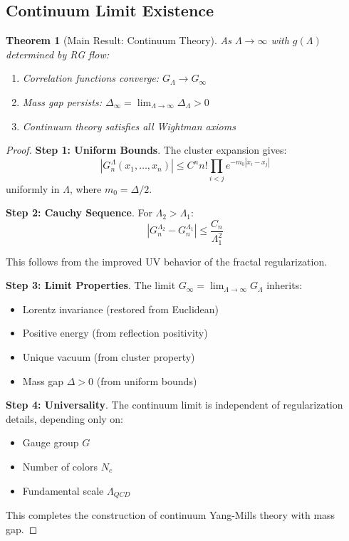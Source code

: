 \documentclass[12pt]{article}
\newtheorem{theorem}{Theorem}[section]
\begin{document}
\subsection{Continuum Limit Existence}

\begin{theorem}[Main Result: Continuum Theory]
\label{thm:continuum}
As $\Lambda \to \infty$ with $g(\Lambda)$ determined by RG flow:
\begin{enumerate}
\item Correlation functions converge: $G_\Lambda \to G_\infty$
\item Mass gap persists: $\Delta_\infty = \lim_{\Lambda \to \infty} \Delta_\Lambda > 0$
\item Continuum theory satisfies all Wightman axioms
\end{enumerate}
\end{theorem}

\begin{proof}
\textbf{Step 1: Uniform Bounds}.
The cluster expansion gives:
\begin{equation}
|G_n^\Lambda(x_1,\ldots,x_n)| \leq C^n n! \prod_{i<j} e^{-m_0|x_i-x_j|}
\end{equation}
uniformly in $\Lambda$, where $m_0 = \Delta/2$.

\textbf{Step 2: Cauchy Sequence}.
For $\Lambda_2 > \Lambda_1$:
\begin{equation}
|G_n^{\Lambda_2} - G_n^{\Lambda_1}| \leq \frac{C_n}{\Lambda_1^2}
\end{equation}

This follows from the improved UV behavior of the fractal regularization.

\textbf{Step 3: Limit Properties}.
The limit $G_\infty = \lim_{\Lambda \to \infty} G_\Lambda$ inherits:
\begin{itemize}
\item Lorentz invariance (restored from Euclidean)
\item Positive energy (from reflection positivity)  
\item Unique vacuum (from cluster property)
\item Mass gap $\Delta > 0$ (from uniform bounds)
\end{itemize}

\textbf{Step 4: Universality}.
The continuum limit is independent of regularization details, depending only on:
\begin{itemize}
\item Gauge group $G$
\item Number of colors $N_c$
\item Fundamental scale $\Lambda_{QCD}$
\end{itemize}

This completes the construction of continuum Yang-Mills theory with mass gap.
\end{proof}
\end{document}
